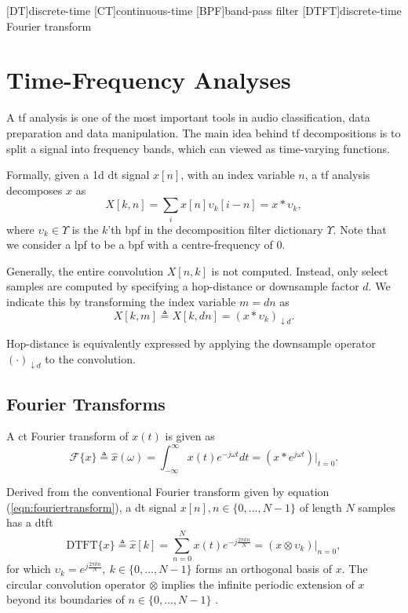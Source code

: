 [DT]{discrete-time}
[CT]{continuous-time}
[BPF]{band-pass filter}
[DTFT]{discrete-time Fourier transform}

\chapter{Time-Frequency Analyses}
\label{chap:p1i}

A \ac{tf} analysis is one of the most important tools in audio classification, data preparation and data manipulation. The main idea behind \ac{tf} decompositions is to split a signal into frequency bands, which can viewed as time-varying functions.

Formally, given a \ac{1d} \ac{dt} signal $x[n]$, with an index variable $n$, a \ac{tf} analysis decomposes $x$ as 
\begin{equation}
    X[k, n] = \sum_i x[n] \upsilon_k[i - n] = x * \upsilon_k,
\end{equation}
where $\upsilon_k \in \Upsilon$ is the $k$'th \ac{bpf} in the decomposition filter dictionary $\Upsilon$. Note that we consider a \ac{lpf} to be a \ac{bpf} with a centre-frequency of 0.

Generally, the entire convolution $X[n,k]$ is not computed. Instead, only select samples are computed by specifying a hop-distance or downsample factor $d$. We indicate this by transforming the index variable $m = dn$ as 
\begin{equation}
    \label{eqn:gentf}
    X[k, m] \triangleq X[k, dn] = \left(x * \upsilon_k\right)_{\downarrow d}.
\end{equation}

Hop-distance is equivalently expressed by applying the downsample operator $\left(\cdot\right)_{\downarrow d}$ to the convolution. 

\section{Fourier Transforms}

A \ac{ct} Fourier transform of $x(t)$ is given as 
\begin{equation}
    \label{eqn:fouriertransform}
    \mathcal{F} \{x\} \triangleq \hat{x}(\omega) = \int_{-\infty}^{\infty} x(t) e^{-j\omega t} dt = \left(x * e^{j\omega t}\right)\bigg|_{t=0}.
\end{equation}


Derived from the conventional Fourier transform given by equation (\ref*{eqn:fouriertransform}), a \ac{dt} signal $x[n], n \in \{0, ..., N-1\}$ of length $N$ samples has a \ac{dtft}
\begin{equation}
    \label{eqn:dtft}
    \text{DTFT}\{x\} \triangleq \hat{x}[k] = \sum_{n=0}^{N} x(t) e^{-j \frac{2\pi k n}{N}} = \left(x \otimes \upsilon_k\right)\bigg|_{n=0},
\end{equation}
for which $\upsilon_k = e^{j \frac{2\pi k n}{N}}, \ k \in \{0, ..., N-1\}$ forms an orthogonal basis of $x$. The circular convolution operator $\otimes$ implies the infinite periodic extension of $x$ beyond its boundaries of $n \in \{0, ..., N-1\}$ \citep{dspbook}. 

